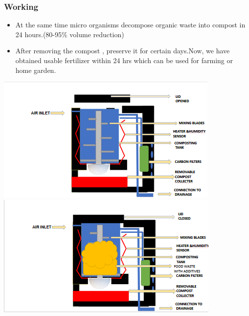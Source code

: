 \documentclass[11pt]{beamer}
\begin{document}
\begin{frame}
	\frametitle{Working}
	\begin{itemize}	
	\item At the same time micro organisms decompose organic waste into compost in 24 hours.(80-95\% volume reduction) \item After removing  the compost , preserve it for certain days.Now, we have obtained usable fertilizer within 24 hrs which can be used for farming or home garden.  
	\end{itemize}
 \includegraphics[height=0.35\textheight]{image.png}
 \hfill
 \includegraphics[height=0.35\textheight]{image1.png}
 \end{frame}
\end{document}
